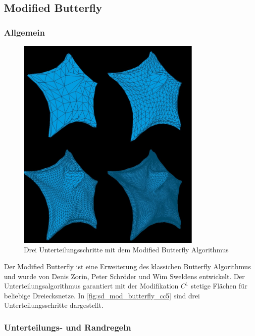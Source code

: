\subsection{Modified Butterfly} \label{subsec:modbutterfly}

\subsubsection*{Allgemein}

\begin{figure}
\centering
\includegraphics[width=0.8\textwidth]{content/media/cc5_edge_mod_butterfly.jpg}
\caption{Drei Unterteilungsschritte mit dem Modified Butterfly Algorithmus}
\label{fig:sd_mod_butterfly_cc5}
\end{figure}

Der Modified Butterfly ist eine Erweiterung des klassichen
Butterfly Algorithmus und wurde von Denis Zorin, Peter Schröder und Wim Sweldens entwickelt.
Der Unterteilungsalgorithmus garantiert mit der Modifikation \(C^1\) stetige Flächen
für beliebige Dreiecksnetze.
In \autoref{fig:sd_mod_butterfly_cc5} sind drei Unterteilungsschritte dargestellt.
\cite[S. 72 ff.]{Zorin.subdivcourse}
\cite{Gamasutra}
\cite{Sharp}

\subsubsection*{Unterteilungs- und Randregeln}

